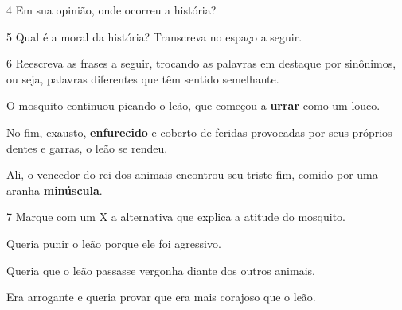 
\num{4} Em sua opinião, onde ocorreu a história?


\num{5} Qual é a moral da história? Transcreva no espaço a seguir.


\num{6} Reescreva as frases a seguir, trocando as palavras em destaque por
sinônimos, ou seja, palavras diferentes que têm sentido
semelhante.


\begin{escolha}
\item O mosquito continuou picando o leão, que começou a \textbf{urrar}
como um louco. 



\item No fim, exausto, \textbf{enfurecido} e coberto de feridas provocadas por seus próprios dentes e garras, o leão se rendeu.



\item Ali, o vencedor do rei dos animais encontrou seu triste fim,
comido por uma aranha \textbf{minúscula}.

\end{escolha}

\num{7} Marque com um X a alternativa que explica a atitude do mosquito.

\begin{boxlist}
\boxitem[] Queria punir o leão porque ele foi agressivo.

\boxitem[] Queria que o leão passasse vergonha diante dos outros animais.

\boxitem[X] Era arrogante e queria provar que era mais corajoso que o leão.
\end{boxlist}

